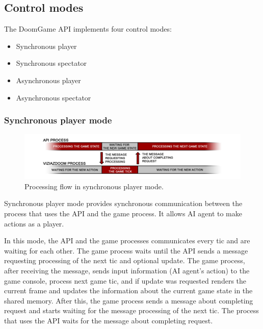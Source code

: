 \documentclass[english,bachelor,a4paper,twoside]{ppfcmthesis}
\begin{document}
\subsection{Control modes}\label{sec:architecture_modes}

The DoomGame API implements four control modes:
    
    \begin{itemize}
    \item Synchronous player
    \item Synchronous spectator
    \item Asynchronous player
    \item Asynchronous spectator
    \end{itemize}
    
    \subsubsection{Synchronous player mode}\label{sec:architecture_player_mode}
    
        \begin{figure}
			    \centering
			    \includegraphics[scale=0.24]{player_mode_diagram.png}
			    \caption{Processing flow in synchronous player mode.}\label{fig:player_mode_diagram}
	    \end{figure}
        
	    Synchronous player mode provides synchronous communication between the process that uses the API and the game process. It allows AI agent to make actions as a player. 
	    
	    In this mode, the API and the game processes communicates every tic and are waiting for each other. The game process waits until the API sends a message requesting processing of the next tic and optional update. The game process, after receiving the message, sends input information (AI agent's action) to the game console, process next game tic, and if update was requested renders the current frame and updates the information about the current game state in the shared memory. After this, the game process sends a message about completing request and starts waiting for the message processing of the next tic. The process that uses the API waits for the message about completing request.
	    
\end{document}
